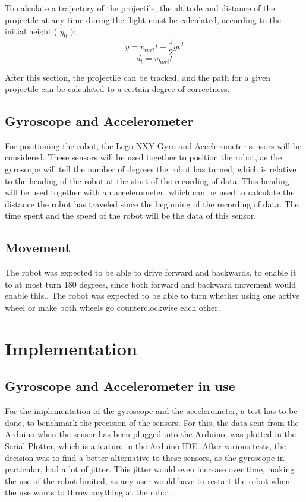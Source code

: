 To calculate a trajectory of the projectile, the altitude and distance of the projectile at any time during the flight must be calculated, according to the initial height ( \(y_{0}\) ):
\[y = v_{vert}t - \dfrac{1}{2} gt^2\]
\[d_{t} = v_{hori}t\]

After this section, the projectile can be tracked, and the path for a given projectile can be calculated to a certain degree of correctness. 

\subsection{Gyroscope and Accelerometer}
\label{sec:i1Gyroscope and Accelerometer}
For positioning the robot, the Lego NXY Gyro and Accelerometer sensors will be considered. These sensors will be used together to position the robot, as the gyroscope will tell the number of degrees the robot has turned, which is relative to the heading of the robot at the start of the recording of data. This heading will be used together with an accelerometer, which can be used to calculate the distance the robot has traveled since the beginning of the recording of data. The time spent and the speed of the robot will be the data of this sensor.


\subsection{Movement}
\label{sec:i1Movement}
The robot was expected to be able to drive forward and backwards, to enable it to at most turn 180 degrees, since both forward and backward movement would enable this.. The robot was expected to be able to turn whether using one active wheel or make both wheels go counterclockwise each other.


\section{Implementation}
\label{sec:i1Implementation}

\subsection{Gyroscope and Accelerometer in use}
\label{sec:i1Gyroscope and Accelerometer in use}
For the implementation of the gyroscope and the accelerometer, a test has to be done, to benchmark the precision of the sensors. For this, the data sent from the Arduino when the sensor has been plugged into the Arduino, was plotted in the Serial Plotter, which is a feature in the Arduino IDE. After various tests, the decision was to find a better alternative to these sensors, as the gyroscope in particular, had a lot of jitter. This jitter would even increase over time, making the use of the robot limited, as any user would have to restart the robot when the use wants to throw anything at the robot.

